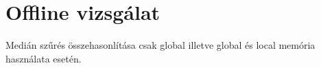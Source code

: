 \chapter{Offline vizsgálat}
Medián szűrés összehasonlítása csak global illetve global és local memória használata esetén.
